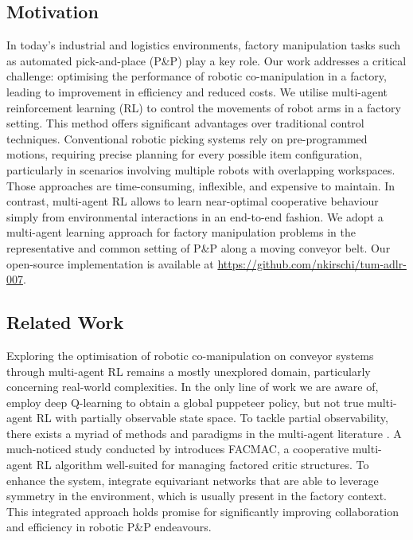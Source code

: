 \documentclass[conference,a4paper]{IEEEtran}
\begin{document}
\subsection{Motivation}

In today's industrial and logistics environments, factory manipulation tasks such as automated pick-and-place (P\&P) play a key role. 
Our work addresses a critical challenge: optimising the performance of robotic co-manipulation in a factory, leading to improvement in efficiency and reduced costs.
We utilise multi-agent reinforcement learning (RL) to control the movements of robot arms in a factory setting. 
This method offers significant advantages over traditional control techniques.
Conventional robotic picking systems \citep[cp.][]{carbonell_coordinated_1998,bozma_multirobot_2012,yu_multi-robot_2017,han_toward_2020} rely on pre-programmed motions, requiring precise planning for every possible item configuration, particularly in scenarios involving multiple robots with overlapping workspaces. 
Those approaches are time-consuming, inflexible, and expensive to maintain.
In contrast, multi-agent RL allows to learn near-optimal cooperative behaviour simply from environmental interactions in an end-to-end fashion.
We adopt a multi-agent learning approach for factory manipulation problems in the representative and common setting of P\&P along a moving conveyor belt. Our open-source implementation is available at \url{https://github.com/nkirschi/tum-adlr-007}.

\subsection{Related Work}

Exploring the optimisation of robotic co-manipulation on conveyor systems through multi-agent RL remains a mostly unexplored domain, particularly concerning real-world complexities.
In the only line of work we are aware of, \citet{lan_towards_2021,lan_coordination_2022} employ deep Q-learning  to obtain a global puppeteer policy, but not true multi-agent RL with partially observable state space. To tackle partial observability, there exists a myriad of methods and paradigms in the multi-agent literature \citep{nguyen_deep_2020}. A much-noticed study conducted by \citet{peng_facmac_2021} introduces FACMAC, a cooperative multi-agent RL algorithm well-suited for managing factored critic structures. 
To enhance the system, \citet{muglich_equivariant_2022} integrate equivariant networks that are able to leverage symmetry in the environment, which is usually present in the factory context.
This integrated approach holds promise for significantly improving collaboration and efficiency in robotic P\&P endeavours.
\end{document}
